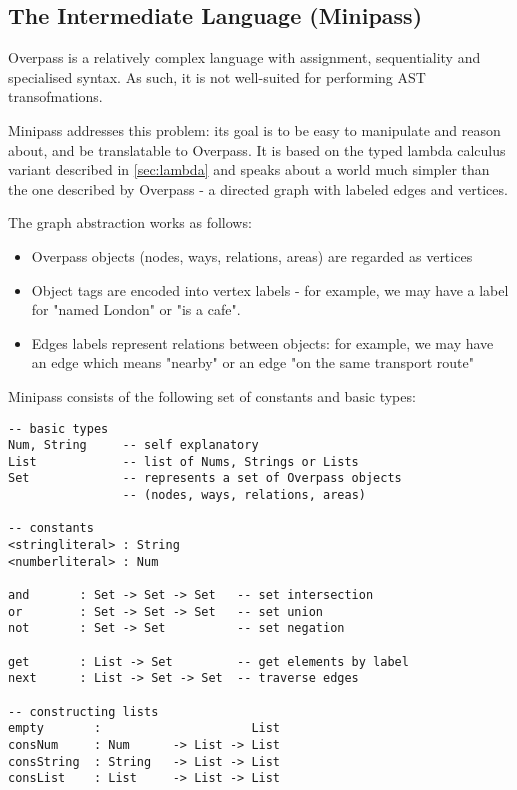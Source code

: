 \documentclass[main.tex]{subfiles}
\begin{document}
\subsection{The Intermediate Language (Minipass)}
Overpass is a relatively complex language with assignment, sequentiality
and specialised syntax. As such, it is not well-suited for performing
AST transofmations.

Minipass addresses this problem: its goal is to be easy to manipulate
and reason about, and be translatable to Overpass. It is based on the typed
lambda calculus variant described in \ref{sec:lambda} and speaks about a
world much simpler than the one described by Overpass - a directed graph
with labeled edges and vertices.

The graph abstraction works as follows:
\begin{itemize}
    \item Overpass objects (nodes, ways, relations, areas) are regarded as
        vertices
    \item Object tags are encoded into vertex labels - for example, we
        may have a label for "named London" or "is a cafe".
    \item Edges labels represent relations between objects: for example,
        we may have an edge which means "nearby" or an edge "on the same
        transport route"
\end{itemize}


Minipass consists of the following set of constants and basic types:

\begin{lstlisting}
-- basic types
Num, String     -- self explanatory
List            -- list of Nums, Strings or Lists
Set             -- represents a set of Overpass objects
                -- (nodes, ways, relations, areas)

-- constants
<stringliteral> : String
<numberliteral> : Num

and       : Set -> Set -> Set   -- set intersection
or        : Set -> Set -> Set   -- set union
not       : Set -> Set          -- set negation

get       : List -> Set         -- get elements by label
next      : List -> Set -> Set  -- traverse edges

-- constructing lists
empty       :                     List
consNum     : Num      -> List -> List
consString  : String   -> List -> List
consList    : List     -> List -> List

\end{lstlisting}
\end{document}
